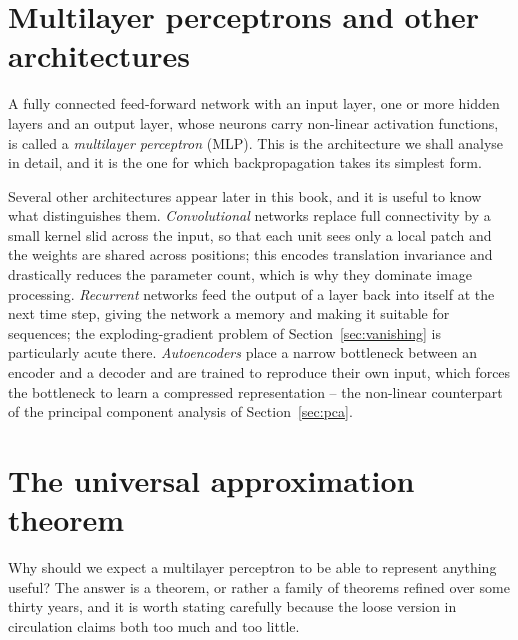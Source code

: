 \section{Multilayer perceptrons and other architectures}
\label{sec:mlp}

A fully connected feed-forward network with an input layer, one or more hidden
layers and an output layer, whose neurons carry non-linear activation
functions, is called a \emph{multilayer perceptron} (MLP).  This is the
architecture we shall analyse in detail, and it is the one for which
backpropagation takes its simplest form.

Several other architectures appear later in this book, and it is useful to know
what distinguishes them.  
\emph{Convolutional} networks replace full
connectivity by a small kernel slid across the input, so that each unit sees
only a local patch and the weights are shared across positions; this encodes
translation invariance and drastically reduces the parameter count, which is
why they dominate image processing.  \emph{Recurrent} networks feed the output
of a layer back into itself at the next time step, giving the network a memory
and making it suitable for sequences; the exploding-gradient problem of
Section~\ref{sec:vanishing} is particularly acute there.  \emph{Autoencoders}
place a narrow bottleneck between an encoder and a decoder and are trained to
reproduce their own input, which forces the bottleneck to learn a compressed
representation -- the non-linear counterpart of the principal component
analysis of Section~\ref{sec:pca}.

\section{The universal approximation theorem}
\label{sec:universal}

Why should we expect a multilayer perceptron to be able to represent anything
useful?  The answer is a theorem, or rather a family of theorems refined over
some thirty years, and it is worth stating carefully because the loose version
in circulation claims both too much and too little.

